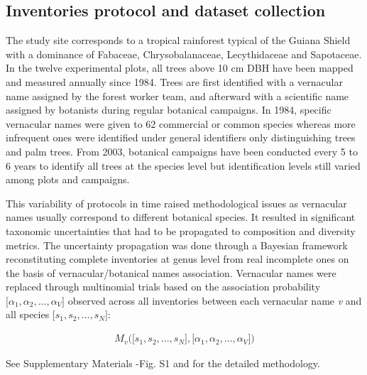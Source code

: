 \documentclass[fleqn,10pt]{ArtEcoFoG} %
\begin{document}
\subsection{Inventories protocol and dataset
collection}\label{inventories-protocol-and-dataset-collection}

The study site corresponds to a tropical rainforest typical of the
Guiana Shield with a dominance of Fabaceae, Chrysobalanaceae,
Lecythidaceae and Sapotaceae. In the twelve experimental plots, all
trees above 10 cm DBH have been mapped and measured annually since 1984.
Trees are first identified with a vernacular name assigned by the forest
worker team, and afterward with a scientific name assigned by botanists
during regular botanical campaigns. In 1984, specific vernacular names
were given to 62 commercial or common species whereas more infrequent
ones were identified under general identifiers only distinguishing trees
and palm trees. From 2003, botanical campaigns have been conducted every
5 to 6 years to identify all trees at the species level but
identification levels still varied among plots and campaigns.

This variability of protocols in time raised methodological issues as
vernacular names usually correspond to different botanical species. It
resulted in significant taxonomic uncertainties that had to be
propagated to composition and diversity metrics. The uncertainty
propagation was done through a Bayesian framework reconstituting
complete inventories at genus level from real incomplete ones on the
basis of vernacular/botanical names association. Vernacular names were
replaced through multinomial trials based on the association probability
\(\big[\alpha_1, \alpha_2,..., \alpha_V\big]\) observed across all
inventories between each vernacular name \emph{v} and all species
\(\big[s_1, s_2,..., s_N\big]\):

\begin{align}
M_v\Big(\big[s_1, s_2,..., s_N\big],\big[\alpha_1, \alpha_2,..., \alpha_V\big]\Big) \nonumber
\end{align}

See Supplementary Materials -Fig. S1 and \citet{Aubry-Kientz2013} for
the detailed methodology.
\end{document}
